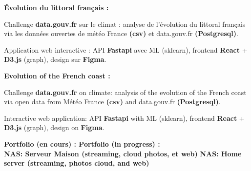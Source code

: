{
\textbf{{Évolution du littoral français : \href{https://\littoral}{\littoral}}}
\hfill {}
\begin{zitemize}
    \item Challenge \textbf{data.gouv.fr} sur le climat : analyse de l'évolution du littoral français via les données ouvertes de météo France \textbf{(csv)} et data.gouv.fr \textbf{(Postgresql)}.
    \item Application web interactive : API \textbf{Fastapi} avec ML (sklearn), frontend \textbf{React} + \textbf{D3.js} (graph), design sur \textbf{Figma}.
\end{zitemize}
}
{
\textbf{{Evolution of the French coast : \href{https://\littoral}{\littoral}}}
\hfill {}
\begin{zitemize}
    \item Challenge \textbf{data.gouv.fr} on climate: analysis of the evolution of the French coast via open data from Météo France \textbf{(csv)} and data.gouv.fr \textbf{(Postgresql)}.
    \item Interactive web application: API \textbf{Fastapi} with ML (sklearn), frontend \textbf{React} + \textbf{D3.js} (graph), design on \textbf{Figma}.
\end{zitemize}
}
{
\textbf{{Portfolio (en cours) : \href{https://\portfolio}{\portfolio}}}
}
{
\textbf{{Portfolio (in progress) : \href{https://\portfolio}{\portfolio}}}
}
\hfill {}\\[1.em]

{
\textbf{{NAS: Serveur Maison (streaming, cloud photos, et web)}}
}
{
\textbf{{NAS: Home server (streaming, photos cloud, and web)}}
}
\hfill {}

